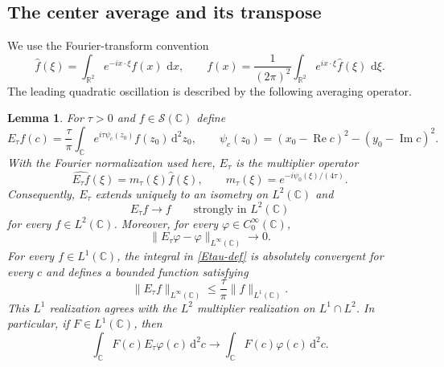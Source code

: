 \documentclass[a4paper,11pt]{article}
\newcommand{\R}{\mathbb{R}}
\newcommand{\C}{\mathbb{C}}
\newcommand{\dd}{\,\text{d}}
\theoremstyle{plain}
\newtheorem{lem}[thm]{Lemma}
\theoremstyle{definition}
\theoremstyle{remark}
\begin{document}
\subsection{The center average and its transpose}

We use the Fourier-transform convention
\[
 \widehat f(\xi)=\int_{\R^2}e^{-ix\cdot\xi}f(x)\,\dd x,
 \qquad
 f(x)=\frac{1}{(2\pi)^2}\int_{\R^2}e^{ix\cdot\xi}\widehat f(\xi)\,\dd\xi.
\]
The leading quadratic oscillation is described by the following averaging operator.

\begin{lem}\label{lem-Etau}
For $\tau>0$ and $f\in\mathcal S(\C)$ define
\begin{equation}\label{Etau-def}
        E_\tau f(c)=\frac{\tau}{\pi}\int_{\C}e^{i\tau\psi_c(z_0)}f(z_0)\dd^2z_0,
        \qquad
        \psi_c(z_0)=(x_0-\operatorname{Re}c)^2-(y_0-\operatorname{Im}c)^2.
\end{equation}
With the Fourier normalization used here, $E_\tau$ is the multiplier operator
\begin{equation}\label{Etau-multiplier}
        \widehat{E_\tau f}(\xi)=m_\tau(\xi)\widehat f(\xi),
        \qquad
        m_\tau(\xi)=e^{-i\psi_0(\xi)/(4\tau)}.
\end{equation}
Consequently, $E_\tau$ extends uniquely to an isometry on $L^2(\C)$ and
\begin{equation}\label{Etau-strong}
        E_\tau f\longrightarrow f
        \qquad\text{strongly in }L^2(\C)
\end{equation}
for every $f\in L^2(\C)$.  Moreover, for every
$\varphi\in C_0^\infty(\C)$,
\begin{equation}\label{Etau-smooth-local}
        \|E_\tau\varphi-\varphi\|_{L^\infty(\C)}\longrightarrow0.
\end{equation}
For every $f\in L^1(\C)$, the integral in \eqref{Etau-def} is absolutely
convergent for every $c$ and defines a bounded function satisfying
\begin{equation}\label{Etau-L1-Linfty-fixed-tau}
        \|E_\tau f\|_{L^\infty(\C)}
        \leq \frac{\tau}{\pi}\|f\|_{L^1(\C)}.
\end{equation}
This $L^1$ realization agrees with the $L^2$ multiplier realization on
$L^1\cap L^2$.  In particular, if $F\in L^1(\C)$, then
\begin{equation}\label{Etau-smooth-pairing}
        \int_{\C}F(c)E_\tau\varphi(c)\dd^2c
        \longrightarrow
        \int_{\C}F(c)\varphi(c)\dd^2c.
\end{equation}
\end{lem}
\end{document}
